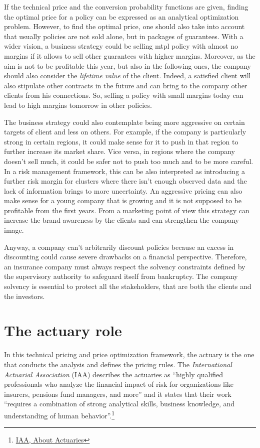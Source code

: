 \documentclass[a4paper, twoside, openright, 12pt]{report}
\theoremstyle{definition}
\theoremstyle{definition}
\theoremstyle{definition}
\theoremstyle{remark}
\begin{document}
If the technical price and the conversion probability functions are given, finding the optimal price for a policy can be expressed as an analytical optimization problem. However, to find the optimal price, one should also take into account that usually policies are not sold alone, but in packages of guarantees. With a wider vision, a business strategy could be selling \ac{mtpl} policy with almost no margins if it allows to sell other guarantees with higher margins. Moreover, as the aim is not to be profitable this year, but also in the following ones, the company should also consider the \emph{lifetime value} of the client. Indeed, a satisfied client will also stipulate other contracts in the future and can bring to the company other clients from his connections. So, selling a policy with small margins today can lead to high margins tomorrow in other policies.

The business strategy could also contemplate being more aggressive on certain targets of client and less on others. For example, if the company is particularly strong in certain regions, it could make sense for it to push in that region to further increase its market share. Vice versa, in regions where the company doesn't sell much, it could be safer not to push too much and to be more careful. In a risk management framework, this can be also interpreted as introducing a further risk margin for clusters where there isn't enough observed data and the lack of information brings to more uncertainty. An aggressive pricing can also make sense for a young company that is growing and it is not supposed to be profitable from the first years. From a marketing point of view this strategy can increase the brand awareness by the clients and can strengthen the company image.

Anyway, a company can't arbitrarily discount policies because an excess in discounting could cause severe drawbacks on a financial perspective. Therefore, an insurance company must always respect the solvency constraints defined by the supervisory authority to safeguard itself from bankruptcy. The company solvency is essential to protect all the stakeholders, that are both the clients and the investors.

\hypertarget{chap:actuary-role}{%
\section{The actuary role}\label{chap:actuary-role}}

In this technical pricing and price optimization framework, the actuary is the one that conducts the analysis and defines the pricing rules. The \emph{International Actuarial Association} (IAA) describes the actuaries as ``highly qualified professionals who analyze the financial impact of risk for organizations like insurers, pensions fund managers, and more'' and it states that their work ``requires a combination of strong analytical skills, business knowledge, and understanding of human behavior''.\footnote{\href{https://www.actuaries.org/iaa/IAA/About_the_IAA/About_Actuaries/About\%20Actuaries.aspx}{IAA, About Actuaries}}
\end{document}
